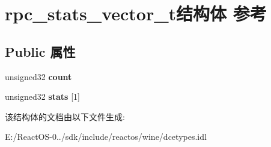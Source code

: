 \hypertarget{structrpc__stats__vector__t}{}\section{rpc\+\_\+stats\+\_\+vector\+\_\+t结构体 参考}
\label{structrpc__stats__vector__t}
\subsection*{Public 属性}
\begin{DoxyCompactItemize}
\item 
\mbox{\label{structrpc__stats__vector__t_aa5fc2eb054db4220d23c2ef362ee47f5}} 
unsigned32 {\bfseries count}
\item 
\mbox{\label{structrpc__stats__vector__t_ae5c95443cd03b14cee6e28bbcae9b13d}} 
unsigned32 {\bfseries stats} \mbox{[}1\mbox{]}
\end{DoxyCompactItemize}


该结构体的文档由以下文件生成\+:\begin{DoxyCompactItemize}
\item 
E\+:/\+React\+O\+S-\/0../sdk/include/reactos/wine/dcetypes.\+idl\end{DoxyCompactItemize}
